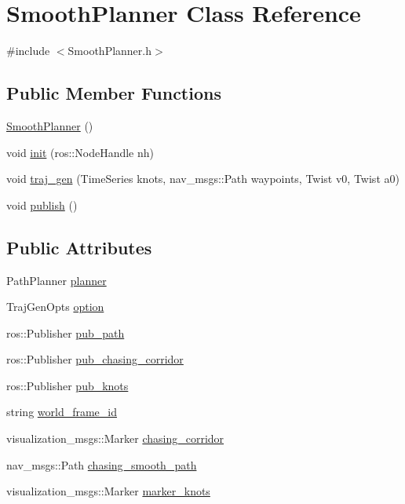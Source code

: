 \hypertarget{class_smooth_planner}{}\section{Smooth\+Planner Class Reference}
\label{class_smooth_planner}


{\ttfamily \#include $<$Smooth\+Planner.\+h$>$}

\subsection*{Public Member Functions}
\begin{DoxyCompactItemize}
\item 
\hyperlink{class_smooth_planner_a84977f10ce3e96fac997076324ca2909}{Smooth\+Planner} ()
\item 
void \hyperlink{class_smooth_planner_a34508c873d458075880afbae0e9c933e}{init} (ros\+::\+Node\+Handle nh)
\item 
void \hyperlink{class_smooth_planner_afc03abbd5f6473f2bc952f70195326ac}{traj\+\_\+gen} (Time\+Series knots, nav\+\_\+msgs\+::\+Path waypoints, Twist v0, Twist a0)
\item 
void \hyperlink{class_smooth_planner_a2996c73522e93adff70eb68e18c55951}{publish} ()
\end{DoxyCompactItemize}
\subsection*{Public Attributes}
\begin{DoxyCompactItemize}
\item 
Path\+Planner \hyperlink{class_smooth_planner_aa9df69d4f514c7338ab2d066d38dd1a2}{planner}
\item 
Traj\+Gen\+Opts \hyperlink{class_smooth_planner_af0c954aea3c6b5b82a160ed4be93fb17}{option}
\item 
ros\+::\+Publisher \hyperlink{class_smooth_planner_a7b8400f711456291e567d0fc204c274b}{pub\+\_\+path}
\item 
ros\+::\+Publisher \hyperlink{class_smooth_planner_a7cd9de34963f445a21a6d0101346b071}{pub\+\_\+chasing\+\_\+corridor}
\item 
ros\+::\+Publisher \hyperlink{class_smooth_planner_a7ee67bceac6d60409542a2250b2ccd08}{pub\+\_\+knots}
\item 
string \hyperlink{class_smooth_planner_ade278c4209b962d8342a2ee30e718c8b}{world\+\_\+frame\+\_\+id}
\item 
visualization\+\_\+msgs\+::\+Marker \hyperlink{class_smooth_planner_addf7aab458c1407f23e3544bd76ac82b}{chasing\+\_\+corridor}
\item 
nav\+\_\+msgs\+::\+Path \hyperlink{class_smooth_planner_a6a33038c6041ff972bea7765780b56d0}{chasing\+\_\+smooth\+\_\+path}
\item 
visualization\+\_\+msgs\+::\+Marker \hyperlink{class_smooth_planner_afeeab9ce830d4960babdc84c82da94ea}{marker\+\_\+knots}
\end{DoxyCompactItemize}


